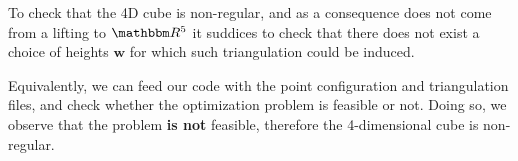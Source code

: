 \begin{enumerate}
      To check that the 4D cube is non-regular, and as a consequence does not come from a lifting to $\RR^5$ it suddices to check that there does not exist a choice of heights $\pmb{w}$ for which such triangulation could be induced.

      Equivalently, we can feed our code with the point configuration and triangulation files, and check whether the optimization problem is feasible or not.
      Doing so, we observe that the problem \textbf{is not} feasible, therefore the 4-dimensional cube is non-regular.
  \end{enumerate}
